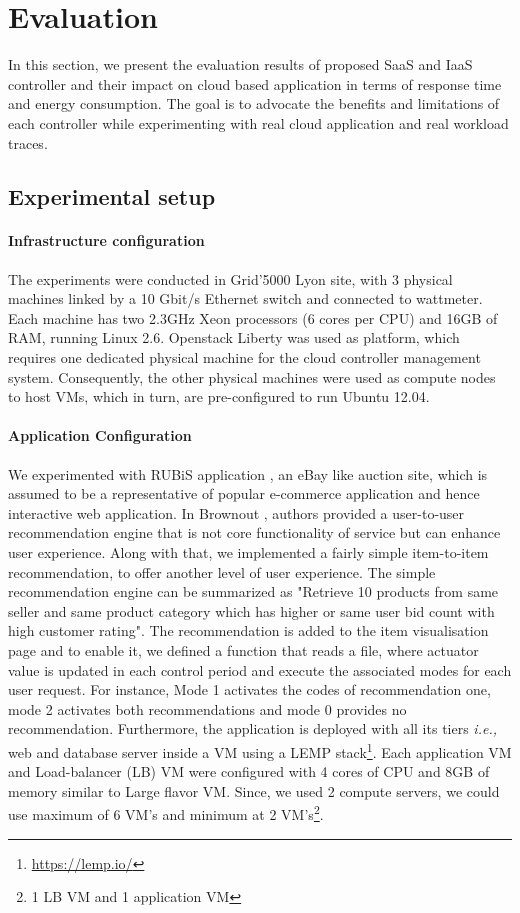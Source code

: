 \section{Evaluation}
In this section, we present the evaluation results of proposed SaaS and IaaS controller and their impact on cloud based application
in terms of response time and energy consumption. The goal is to advocate the benefits
and limitations of each controller while experimenting
with real cloud application and real workload traces.

\subsection{Experimental setup}
\paragraph*{\textbf{Infrastructure configuration}}The experiments were conducted in Grid'5000 Lyon site,
with 3 physical machines linked by a 10 Gbit/s Ethernet
switch and connected to wattmeter. Each machine has two
2.3GHz Xeon processors (6 cores per CPU) and 16GB of
RAM, running Linux 2.6. Openstack Liberty was used
as platform, which requires one dedicated physical machine
for the cloud controller management system. Consequently,
the other physical machines were used as compute nodes to
host VMs, which in turn, are pre-configured to run Ubuntu
12.04.

\paragraph*{\textbf{Application Configuration}} We experimented with
RUBiS application \cite{rubis}, an eBay like auction site, which
is assumed to be a representative of popular e-commerce application 
and hence interactive web application. In Brownout \cite{brownout}, authors provided a user-to-user recommendation engine that is not core functionality of service but can enhance user experience. Along with that, we implemented a fairly simple item-to-item recommendation, to offer another level of user experience. The
simple recommendation engine can be summarized as "Retrieve 10 products from same seller and same product category which has higher or same user bid count with high customer rating". The recommendation is added
to the item visualisation page and to enable it, we defined
a function that reads a file, where actuator value is updated
in each control period and execute the associated modes for
each user request. For instance, Mode 1 activates the codes of
recommendation one, mode 2 activates both recommendations
and mode 0 provides no recommendation. Furthermore, the application is deployed with all its tiers \emph{i.e.,} web and database server inside a VM using a LEMP stack\footnote{\url{https://lemp.io/}}. Each application VM and Load-balancer (LB) VM were configured with 4 cores of CPU and 8GB of memory similar to Large flavor VM. Since, we used 2 compute servers, we could use maximum of 6 VM's and minimum at 2 VM's\footnote{1 LB VM and 1 application VM}. 

